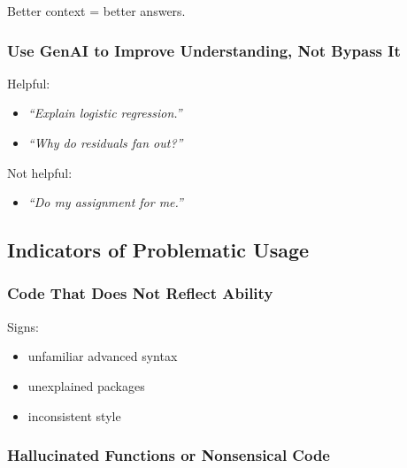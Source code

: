 \documentclass[
  letterpaper,
  8pt,
  a4paper]{book}
\providecommand{\tightlist}{%
  \setlength{\itemsep}{0pt}\setlength{\parskip}{0pt}}
\begin{document}
Better context = better answers.

\subsubsection*{Use GenAI to Improve Understanding, Not Bypass
It}\label{use-genai-to-improve-understanding-not-bypass-it}

Helpful:

\begin{itemize}
\tightlist
\item
  \emph{``Explain logistic regression.''}\\
\item
  \emph{``Why do residuals fan out?''}
\end{itemize}

Not helpful:

\begin{itemize}
\tightlist
\item
  \emph{``Do my assignment for me.''}
\end{itemize}

\subsection*{Indicators of Problematic
Usage}\label{indicators-of-problematic-usage}

\subsubsection*{Code That Does Not Reflect
Ability}\label{code-that-does-not-reflect-ability}

Signs:

\begin{itemize}
\tightlist
\item
  unfamiliar advanced syntax\\
\item
  unexplained packages\\
\item
  inconsistent style
\end{itemize}

\subsubsection*{Hallucinated Functions or Nonsensical
Code}\label{hallucinated-functions-or-nonsensical-code}
\end{document}
